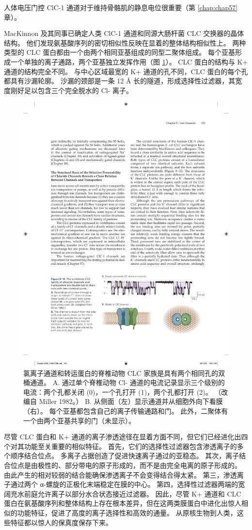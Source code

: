 人体电压门控 ClC-1 通道对于维持骨骼肌的静息电位很重要（第 \ref{chap:chap57} 章）。


MacKinnon 及其同事已确定人类 ClC-1 通道和同源大肠杆菌 CLC 交换器的晶体结构。 
他们发现氨基酸序列的密切相似性反映在显着的整体结构相似性上。 
两种类型的 CLC 蛋白都由一个由两个相同亚基组成的同型二聚体组成。 
每个亚基形成一个单独的离子通路，两个亚基独立发挥作用（图 \ref{fig:8_15}）。 
CLC 蛋白的结构与 K+ 通道的结构完全不同。 
与中心区域最宽的 K+ 通道的孔不同，CLC 蛋白的每个孔都具有沙漏轮廓。 
沙漏的颈部是一条 12 Å 长的隧道，形成选择性过滤器，其宽度刚好足以包含三个完全脱水的 Cl- 离子。

\begin{figure}[htbp]
	\centering
	\includegraphics[width=0.6\linewidth]{chap08/fig_8_15}
	\caption{氯离子通道和转运蛋白的脊椎动物 CLC 家族是具有两个相同孔的双桶通道。 A. 通过单个脊椎动物 Cl- 通道的电流记录显示三个级别的电流：两个孔都关闭 (0)，一个孔打开 (1)，两个孔都打开 (2)。 （改编自 Miller 1982。） B. 从侧面（左）显示通道并从细胞外向下看膜（右）。 每个亚基都包含自己的离子传输通路和门。 此外，二聚体有一个由两个亚基共享的门（未显示）。}
	\label{fig:8_15}
\end{figure}


尽管 CLC 蛋白和 K+ 通道的离子渗透途径在显着方面不同，但它们已经进化出四个对其功能至关重要的相似特征。 
首先，它们的选择性过滤器包含渗透离子的多个顺序结合位点。 
多离子占据创造了促进快速离子通过的亚稳态。 
其次，离子结合位点是由极性的、部分带电的原子形成的，而不是由完全电离的原子形成的。 
由此产生的相对较弱的结合能确保渗透离子不会变得结合得太紧。 
第三，渗透离子通过两个 α-螺旋的正极化末端稳定在膜的中心。 
第四，选择性过滤器两端的宽阔充水前庭允许离子以部分水合状态接近过滤器。 
因此，尽管 K+ 通道和 CLC 蛋白在氨基酸序列和整体结构上存在根本差异，但在这两类膜蛋白中进化出惊人相似的功能特征，促进了高度的离子选择性和高效的通量。 
从原核生物到人类，这些特征都以惊人的保真度保存下来。


